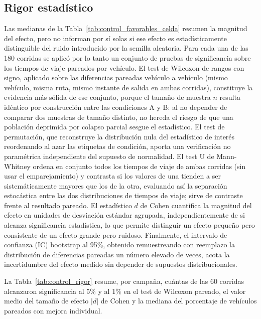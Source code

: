 \subsection{Rigor estadístico}
\label{subsec:control_rigor}

Las medianas de la Tabla~\ref{tab:control_favorables_celda} resumen la magnitud del
efecto, pero no informan por sí solas si ese efecto es estadísticamente distinguible del
ruido introducido por la semilla aleatoria. Para cada una de las 180 corridas se aplicó
por lo tanto un conjunto de pruebas de significancia sobre los tiempos de viaje pareados
por vehículo. El test de Wilcoxon de rangos con signo, aplicado sobre las diferencias
pareadas vehículo a vehículo (mismo vehículo, misma ruta, mismo instante de salida en
ambas corridas), constituye la evidencia más sólida de ese conjunto, porque el tamaño de
muestra $n$ resulta idéntico por construcción entre las condiciones A y B: al no
depender de comparar dos muestras de tamaño distinto, no hereda el riesgo de que una
población deprimida por colapso parcial sesgue el estadístico. El test de permutación,
que reconstruye la distribución nula del estadístico de interés reordenando al azar las
etiquetas de condición, aporta una verificación no paramétrica independiente del supuesto
de normalidad. El test U de Mann-Whitney ordena en conjunto todos los tiempos de viaje de ambas corridas
(sin usar el emparejamiento) y contrasta si los valores de una tienden a ser
sistemáticamente mayores que los de la otra, evaluando así la separación estocástica entre
las dos distribuciones de tiempos de viaje; sirve de contraste frente al resultado pareado. El estadístico $d$ de Cohen cuantifica la magnitud del efecto en
unidades de desviación estándar agrupada, independientemente de si alcanza significancia
estadística, lo que permite distinguir un efecto pequeño pero consistente de un efecto
grande pero ruidoso. Finalmente, el intervalo de confianza (IC) bootstrap al 95\%,
obtenido remuestreando con reemplazo la distribución de diferencias pareadas
un número elevado de veces, acota la incertidumbre del efecto medido sin depender de
supuestos distribucionales.

La Tabla~\ref{tab:control_rigor} resume, por campaña, cuántas de las 60 corridas
alcanzaron significancia al 5\% y al 1\% en el test de Wilcoxon pareado, el valor medio
del tamaño de efecto $|d|$ de Cohen y la mediana del porcentaje de vehículos pareados con
mejora individual.

